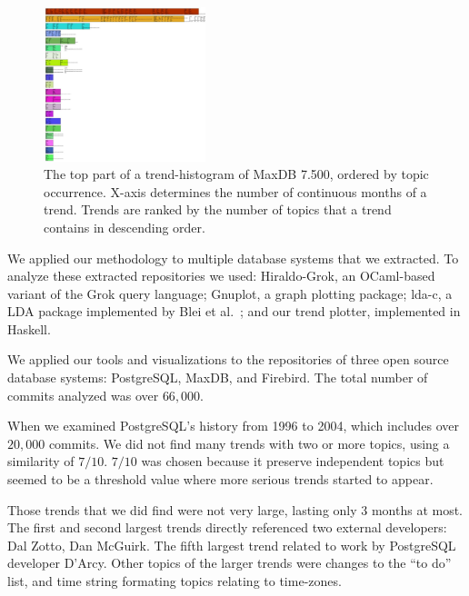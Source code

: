 \documentclass[times, 10pt,twocolumn]{article}
\newcommand{\shrinkit}{\vspace*{-.3em}}
\begin{document}
\begin{figure}
  \centering
  \includegraphics[width=0.42\textwidth]{histogram-cropped-scaled}
  \caption{The top part of a trend-histogram of MaxDB 7.500, ordered
    by topic occurrence. X-axis determines the number of continuous
    months of a trend. Trends are ranked by the number of topics that
    a trend contains in descending order.}
  \label{fig:histogram}
\end{figure}



\shrinkit
{}
\shrinkit

We applied our methodology to multiple database systems that we
extracted.  To analyze these extracted repositories we used:
Hiraldo-Grok, an OCaml-based variant of the Grok query language;
Gnuplot, a graph plotting package; lda-c, a LDA package implemented by
Blei et al.~\cite{944937}; and our trend plotter, implemented in
Haskell.

We applied our tools and visualizations to the repositories of three
open source database systems: PostgreSQL, MaxDB, and Firebird. The
total number of commits analyzed was over $66,000$.


\shrinkit
{}
\shrinkit


When we examined PostgreSQL's history from 1996 to 2004, which includes
over $20,000$ commits. We did not find many trends with two or more
topics, using a similarity of $7/10$. $7/10$ was chosen because it
preserve independent topics but seemed to be a threshold
value where more serious trends started to appear.

Those trends that we did find
were not very large, lasting only 3 months at most. The first and second
largest trends directly referenced two external developers:
Dal Zotto, Dan McGuirk. The fifth largest trend related to work by
PostgreSQL developer D'Arcy. Other topics of the larger trends were
changes to the ``to do'' list, and time string formating topics
relating to time-zones.
\end{document}
